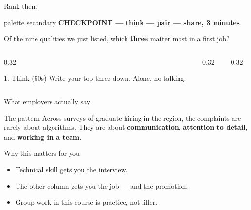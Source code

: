\documentclass[aspectratio=169]{beamer}
\newcommand{\checkpoint}[1]{%
  \begin{beamercolorbox}[sep=4pt, rounded=true, wd=\textwidth]{palette secondary}
    \centering\small\textbf{\faHandPaper\; CHECKPOINT --- #1}
  \end{beamercolorbox}%
}
\begin{document}
\begin{frame}{Rank them}
  \checkpoint{think --- pair --- share, 3 minutes}
  \vspace{0.3cm}
  \begin{center}
    \large Of the nine qualities we just listed, which \textbf{three} matter
    most in a first job?
  \end{center}
  \vspace{0.4cm}
  \begin{columns}[T]
    \begin{column}{0.32\textwidth}
      \begin{block}{1. Think (60s)}
        \small Write your top three down. Alone, no talking.
      \end{block}
    \end{column}
    \begin{column}{0.32\textwidth}
    \end{column}
    \begin{column}{0.32\textwidth}
    \end{column}
  \end{columns}
  \vspace{0.3cm}
\end{frame}

\begin{frame}{What employers actually say}
  \hypertarget{ans:qualities}{}
  \begin{exampleblock}{The pattern}
    Across surveys of graduate hiring in the region, the complaints are rarely
    about algorithms. They are about \textbf{communication}, \textbf{attention
    to detail}, and \textbf{working in a team}.
  \end{exampleblock}
  \vspace{0.3cm}
  \begin{block}{Why this matters for you}
    \begin{itemize}
      \item Technical skill gets you the interview.
      \item The other column gets you the job --- and the promotion.
      \item Group work in this course is practice, not filler.
    \end{itemize}
  \end{block}
\end{frame}
\end{document}
